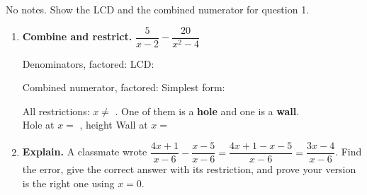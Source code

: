 \documentclass[10pt]{article}
\begin{document}
\namedateperiod

\vspace{0.08in}

No notes. Show the LCD and the combined numerator for question 1.

\vspace{0.06in}

\begin{enumerate}[leftmargin=1.8em, itemsep=9pt]
  \item \textbf{Combine and restrict.} \; $\dfrac{5}{x-2}-\dfrac{20}{x^2-4}$

        \vspace{4pt}
        Denominators, factored:  \quad LCD: 

        \vspace{4pt}
        Combined numerator, factored:  \quad Simplest form: 

        \vspace{4pt}
        All restrictions: $x\neq$ . \; One of them is a \textbf{hole} and one is a
        \textbf{wall}. \\[3pt]
        Hole at $x=$ , height  \qquad Wall at $x=$ 

  \item \textbf{Explain.} A classmate wrote
        $\dfrac{4x+1}{x-6}-\dfrac{x-5}{x-6}=\dfrac{4x+1-x-5}{x-6}=\dfrac{3x-4}{x-6}$.
        Find the error, give the correct answer with its restriction, and prove your version is the
        right one using $x=0$.


\end{enumerate}
\end{document}

